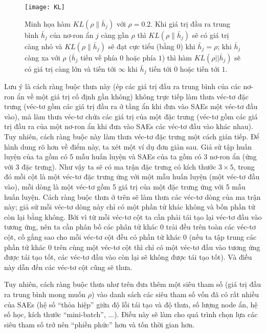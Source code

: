 \begin{figure}
	\centering
	\texttt{[image: KL]}
	\caption[Minh họa hàm $KL(\rho\|\bar{h}_j)$ với $\rho=0.2$]{Minh họa hàm $KL(\rho\|\bar{h}_j)$ với $\rho=0.2$. Khi giá trị đầu ra trung bình $\bar{h}_j$ của nơ-ron ẩn $j$ càng gần $\rho$ thì $KL(\rho\|\bar{h}_j)$ sẽ có giá trị càng nhỏ và $KL(\rho\|\bar{h}_j)$ sẽ đạt cực tiểu (bằng $0$) khi $\bar{h}_j = \rho$; khi $\bar{h}_j$ càng xa với $\rho$ ($\bar{h}_j$ tiến về phía $0$ hoặc phía $1$) thì hàm $KL(\rho||\bar{h}_j)$ sẽ có giá trị càng lớn và tiến tới $\infty$ khi $\bar{h}_j$ tiến tới $0$ hoặc tiến tới $1$.}
	\label{fig_KL}
\end{figure}

Lưu ý là cách ràng buộc thưa này (ép các giá trị đầu ra trung bình của các nơ-ron ẩn về một giá trị cố định gần không) không trực tiếp làm thưa véc-tơ đặc trưng (véc-tơ gồm các giá trị đầu ra ở tầng ẩn khi đưa vào SAEs một véc-tơ đầu vào), mà làm thưa véc-tơ chứa các giá trị của một đặc trưng (véc-tơ gồm các giá trị đầu ra của một nơ-ron ẩn khi đưa vào SAEs các véc-tơ đầu vào khác nhau). Tuy nhiên, cách ràng buộc này làm thưa véc-tơ đặc trưng một cách gián tiếp. Để hình dung rõ hơn về điểm này, ta xét một ví dụ đơn giản sau. Giả sử tập huấn luyện của ta gồm có 5 mẫu huấn luyện và SAEs của ta gồm có 3 nơ-ron ẩn (ứng với 3 đặc trưng). Như vậy ta sẽ có ma trận đặc trưng có kích thước $3\times 5$, trong đó mỗi cột là một véc-tơ đặc trưng ứng với một mẫu huấn luyện (một véc-tơ đầu vào), mỗi dòng là một véc-tơ gồm 5 giá trị của một đặc trưng ứng với 5 mẫu huấn luyện. Cách ràng buộc thưa ở trên sẽ làm thưa các véc-tơ dòng của ma trận này; giả sử mỗi véc-tơ dòng này chỉ có một phần tử khác không và bốn phần tử còn lại bằng không. Bởi vì từ mỗi véc-tơ cột ta cần phải tái tạo lại véc-tơ đầu vào tương ứng, nên ta cần phân bố các phân tử khác 0 trải đều trên toàn các véc-tơ cột, cố gắng sao cho mỗi véc-tơ cột đều có phần tử khác 0 (nếu ta tập trung các phần tử khác 0 trên cùng một véc-tơ cột thì chỉ có một véc-tơ đầu vào tương ứng được tái tạo tốt, các véc-tơ đầu vào còn lại sẽ không được tái tạo tốt). Và điều này dẫn đến các véc-tơ cột cũng sẽ thưa.

Tuy nhiên, cách ràng buộc thưa như trên đưa thêm một siêu tham số (giá trị đầu ra trung bình mong muốn $\rho$) vào danh sách các siêu tham số vốn đã có rất nhiều của SAEs (hệ số ``thỏa hiệp'' giữa độ lỗi tái tạo và độ thưa, số lượng node ẩn, hệ số học, kích thước ``mini-batch'', ...). Điều này sẽ làm cho quá trình chọn lựa các siêu tham số trở nên ``phiền phức'' hơn và tốn thời gian hơn. 

